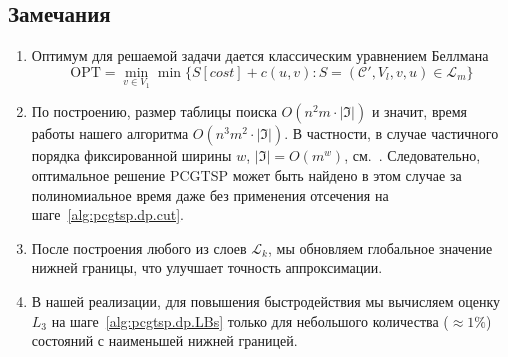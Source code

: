 \subsection{Замечания}

\begin{enumerate}
  \item
  Оптимум для решаемой задачи дается классическим уравнением Беллмана
  \[
    \mathrm{OPT}=\min_{v\in V_1}\min\{S[cost]+c(u,v)\colon S=(\mathcal C',V_l, v, u)\in\mathcal L_m\}
  \]
  \item
  По построению,
  размер таблицы поиска
  $O(n^2m\cdot |\mathfrak I|)$
  и значит, время работы нашего алгоритма
  $O(n^3m^2\cdot |\mathfrak I|)$.
  В частности,
  в случае частичного порядка фиксированной ширины
  $w$, $|\mathfrak I|=O(m^w)$,
  см.~\cite{Steiner-1990}.
  Следовательно,
  оптимальное решение
  PCGTSP
  может быть найдено в этом случае за полиномиальное время
  даже без применения отсечения на шаге~\ref{alg:pcgtsp.dp.cut}.

  \item
  После построения любого из слоев
  $\mathcal L_k$,
  мы обновляем глобальное значение нижней границы,
  что улучшает точность аппроксимации.

  \item
  В нашей реализации,
  для повышения быстродействия
  мы вычисляем оценку $L_3$
  на шаге~\ref{alg:pcgtsp.dp.LBs}
  только для небольшого количества
  ($\approx 1\%$)
  состояний с наименьшей нижней границей.
\end{enumerate}

